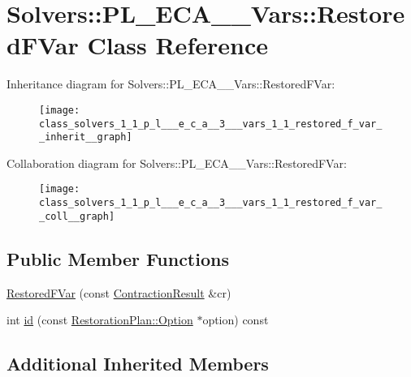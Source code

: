 \hypertarget{class_solvers_1_1_p_l___e_c_a__3___vars_1_1_restored_f_var}{}\section{Solvers\+:\+:P\+L\+\_\+\+E\+C\+A\+\_\+\_\+\+Vars\+:\+:Restored\+F\+Var Class Reference}
\label{class_solvers_1_1_p_l___e_c_a__3___vars_1_1_restored_f_var}


Inheritance diagram for Solvers\+:\+:P\+L\+\_\+\+E\+C\+A\+\_\+\_\+\+Vars\+:\+:Restored\+F\+Var\+:\nopagebreak
\begin{figure}[H]
\begin{center}
\leavevmode
\texttt{[image: class\_solvers\_1\_1\_p\_l\_\_\_e\_c\_a\_\_3\_\_\_vars\_1\_1\_restored\_f\_var\_\_inherit\_\_graph]}
\end{center}
\end{figure}


Collaboration diagram for Solvers\+:\+:P\+L\+\_\+\+E\+C\+A\+\_\+\_\+\+Vars\+:\+:Restored\+F\+Var\+:\nopagebreak
\begin{figure}[H]
\begin{center}
\leavevmode
\texttt{[image: class\_solvers\_1\_1\_p\_l\_\_\_e\_c\_a\_\_3\_\_\_vars\_1\_1\_restored\_f\_var\_\_coll\_\_graph]}
\end{center}
\end{figure}
\subsection*{Public Member Functions}
\begin{DoxyCompactItemize}
\item 
\hyperlink{class_solvers_1_1_p_l___e_c_a__3___vars_1_1_restored_f_var_aaed3e70e43300c1278e832fa7c8fa4b3}{Restored\+F\+Var} (const \hyperlink{class_contraction_result}{Contraction\+Result} \&cr)
\item 
int \hyperlink{class_solvers_1_1_p_l___e_c_a__3___vars_1_1_restored_f_var_a6b81867338d51f2b392aad8b2e795efb}{id} (const \hyperlink{class_restoration_plan_1_1_option}{Restoration\+Plan\+::\+Option} $\ast$option) const
\end{DoxyCompactItemize}
\subsection*{Additional Inherited Members}


